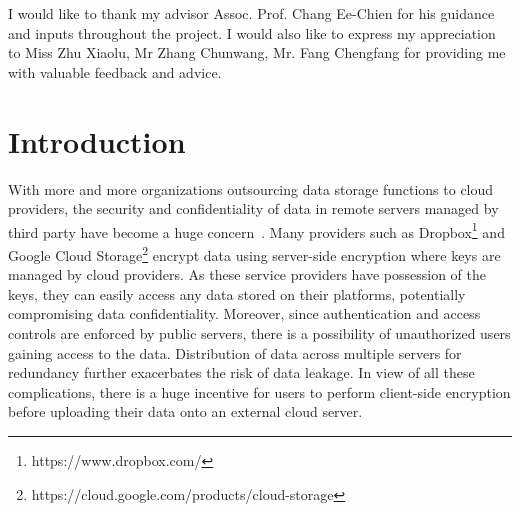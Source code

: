 \documentclass[hyp,a4paper,12pt,openbib]{socreport}
\begin{document}
\begin{abstract}
\begin{descriptors}
    \item E.3 Data Encryption
\end{descriptors}
\begin{keywords}
	applied cryptography, range query, multimedia encryption, attribute-based encryption, key aggregation
\end{keywords}

\begin{implement}
	Macbook Air 2013 (Intel Core-i7-4650u), Mac OS v10.9.2, Python 2.7.5, Charm v0.43
\end{implement}

\end{abstract}

\begin{acknowledgement}
   I would like to thank my advisor Assoc. Prof. Chang Ee-Chien for his guidance and inputs throughout the project. I would also like to express my appreciation to Miss Zhu Xiaolu, Mr Zhang Chunwang, Mr. Fang Chengfang for providing me with valuable feedback and advice.  \end{acknowledgement}

\listoffigures 
\listoftables
\tableofcontents 

\chapter{Introduction}

\label{chap:1}
With more and more organizations outsourcing data storage functions to cloud providers, the security and confidentiality of data in remote servers managed by third party have become a huge concern~\cite{kamara2010cryptographic}. Many providers such as Dropbox\footnote{https://www.dropbox.com/} and Google Cloud Storage\footnote{https://cloud.google.com/products/cloud-storage} encrypt data using server-side encryption where keys are managed by cloud providers. As these service providers have possession of the keys, they can easily access any data stored on their platforms, potentially compromising data confidentiality. Moreover, since authentication and access controls are enforced by public servers, there is a possibility of unauthorized users gaining access to the data. Distribution of data across multiple servers for redundancy further exacerbates the risk of data leakage. In view of all these complications, there is a huge incentive for users to perform client-side encryption before uploading their data onto an external cloud server. 
\end{document}
